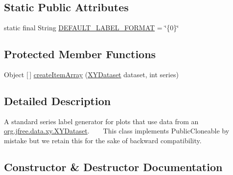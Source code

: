 \subsection*{Static Public Attributes}
\begin{DoxyCompactItemize}
\item 
static final String \mbox{\hyperlink{classorg_1_1jfree_1_1chart_1_1labels_1_1_standard_x_y_series_label_generator_a339616fa3be9aa12a774dd78f1b03343}{D\+E\+F\+A\+U\+L\+T\+\_\+\+L\+A\+B\+E\+L\+\_\+\+F\+O\+R\+M\+AT}} = \char`\"{}\{0\}\char`\"{}
\end{DoxyCompactItemize}
\subsection*{Protected Member Functions}
\begin{DoxyCompactItemize}
\item 
Object \mbox{[}$\,$\mbox{]} \mbox{\hyperlink{classorg_1_1jfree_1_1chart_1_1labels_1_1_standard_x_y_series_label_generator_a033818dd47b6e203c8c66734bcb0e8d6}{create\+Item\+Array}} (\mbox{\hyperlink{interfaceorg_1_1jfree_1_1data_1_1xy_1_1_x_y_dataset}{X\+Y\+Dataset}} dataset, int series)
\end{DoxyCompactItemize}


\subsection{Detailed Description}
A standard series label generator for plots that use data from an \mbox{\hyperlink{interfaceorg_1_1jfree_1_1data_1_1xy_1_1_x_y_dataset}{org.\+jfree.\+data.\+xy.\+X\+Y\+Dataset}}. ~\newline
~\newline
 This class implements {\ttfamily Public\+Cloneable} by mistake but we retain this for the sake of backward compatibility. 

\subsection{Constructor \& Destructor Documentation}
\mbox{\label{classorg_1_1jfree_1_1chart_1_1labels_1_1_standard_x_y_series_label_generator_ac776d17a7c4d8a8794e78a6f55dd91e6}} 
